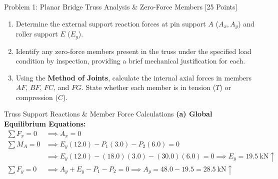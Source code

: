 \documentclass[11pt, a4paper, titlepage=false]{scrartcl}
\begin{document}
\begin{problembox}{Problem 1: Planar Bridge Truss Analysis \& Zero-Force Members \hfill [25 Points]}
    \begin{enumerate}[label=\alph*\lbrack\arabic*\rbrack, leftmargin=*, font=\bfseries\color{SecondaryTeal}]
        \item Determine the external support reaction forces at pin support $A$ ($A_x, A_y$) and roller support $E$ ($E_y$).
        \item Identify any zero-force members present in the truss under the specified load condition by inspection, providing a brief mechanical justification for each.
        \item Using the \textbf{Method of Joints}, calculate the internal axial forces in members $AF$, $BF$, $FC$, and $FG$. State whether each member is in tension ($T$) or compression ($C$).
    \end{enumerate}
\end{problembox}

\begin{solutionworkspace}{Truss Support Reactions \& Member Force Calculations}
    \textbf{(a) Global Equilibrium Equations:}
    \begin{align*}
        \sum F_x = 0 &\implies A_x = 0 \\
        \sum M_A = 0 &\implies E_y (12.0) - P_1 (3.0) - P_2 (6.0) = 0 \\
        &\implies E_y (12.0) - (18.0)(3.0) - (30.0)(6.0) = 0 \implies E_y = \SI{19.5}{\kilo\newton} \uparrow \\
        \sum F_y = 0 &\implies A_y + E_y - P_1 - P_2 = 0 \implies A_y = 48.0 - 19.5 = \SI{28.5}{\kilo\newton} \uparrow
    \end{align*}

    \vspace{4.5cm} %
\end{solutionworkspace}

\newpage
\end{document}
